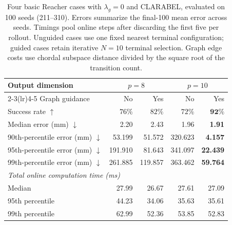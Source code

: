\documentclass[10pt]{article}
\begin{document}
\begin{table}[htbp]
\centering
\small
\begin{tabular}{lrrrr}
\toprule
Output dimension & \multicolumn{2}{c}{$p=8$} & \multicolumn{2}{c}{$p=10$} \\
\cmidrule(lr){2-3}\cmidrule(lr){4-5}
Graph guidance & No & Yes & No & Yes \\
\midrule
Success rate $\uparrow$ & $76\%$ & $82\%$ & $72\%$ & $\mathbf{92\%}$ \\
Median error (mm) $\downarrow$ & 2.20 & 2.43 & 1.96 & \textbf{1.91} \\
90th-percentile error (mm) $\downarrow$ & 53.199 & 51.572 & 320.623 & \textbf{4.157} \\
95th-percentile error (mm) $\downarrow$ & 191.910 & 81.643 & 341.097 & \textbf{22.439} \\
99th-percentile error (mm) $\downarrow$ & 261.885 & 119.857 & 363.462 & \textbf{59.764} \\
\midrule
\multicolumn{5}{l}{\textit{Total online computation time (ms)}} \\
Median & 27.99 & 26.67 & 27.61 & 27.09 \\
95th percentile & 44.23 & 34.06 & 35.63 & 35.61 \\
99th percentile & 62.99 & 52.36 & 53.85 & 52.83 \\
\bottomrule
\end{tabular}
\caption{Four basic Reacher cases with $\lambda_g=0$ and CLARABEL, evaluated on 100 seeds (211--310). Errors summarize the final-100 mean error across seeds. Timings pool online steps after discarding the first five per rollout. Unguided cases use one fixed nearest terminal configuration; guided cases retain iterative $N=10$ terminal selection. Graph edge costs use chordal subspace distance divided by the square root of the transition count.}
\label{tab:basic-cases-clarabel-lamg0}
\end{table}
\end{document}
